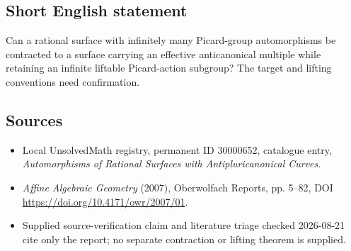 \documentclass[11pt]{article}
\begin{document}
\subsection{Short English statement}
Can a rational surface with infinitely many Picard-group automorphisms be contracted to a surface carrying an effective anticanonical multiple while retaining an infinite liftable Picard-action subgroup? The target and lifting conventions need confirmation.
\subsection{Sources}
\begin{itemize}
\item Local UnsolvedMath registry, permanent ID 30000652, catalogue entry, \emph{Automorphisms of Rational Surfaces with Antipluricanonical Curves}.
\item \emph{Affine Algebraic Geometry} (2007), Oberwolfach Reports, pp. 5--82, DOI \url{https://doi.org/10.4171/owr/2007/01}.
\item Supplied source-verification claim and literature triage checked 2026-08-21 cite only the report; no separate contraction or lifting theorem is supplied.
\end{itemize}
\end{document}
